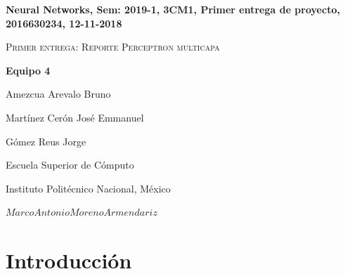 \documentclass{article}
\date{}
\begin{document}
\centerline{\bf Neural Networks, Sem: 2019-1, 3CM1, Primer entrega de proyecto, 2016630234, 12-11-2018}
\centerline{}
\centerline{}
\begin{center}
\Large{\textsc{Primer entrega: Reporte Perceptron multicapa}}
\end{center}
\centerline{}
\centerline{\bf {Equipo 4}}
\centerline{Amezcua Arevalo Bruno}
\centerline{Mart\'inez Cer\'on Jos\'e Emmanuel}
\centerline{G\'omez Reus Jorge}
\centerline{}
\centerline{Escuela Superior de C\'omputo}
\centerline{Instituto Polit\'ecnico Nacional, M\'exico}
\centerline{$Marco Antonio Moreno Armendariz$}
\newtheorem{Theorem}{\quad Theorem}[section]
\newtheorem{Definition}[Theorem]{\quad Definition}
\newtheorem{Corollary}[Theorem]{\quad Corollary}
\newtheorem{Lemma}[Theorem]{\quad Lemma}
\newtheorem{Example}[Theorem]{\quad Example}
\bigskip

\section{Introducci\'on}
\end{document}
